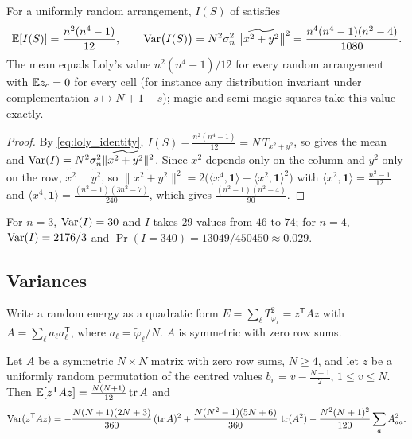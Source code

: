 \begin{corollary}
\label{cor:loly_null}
For a uniformly random arrangement, $I(S)$ of  satisfies
\begin{equation}
\mathbb{E}[I(S)]=\frac{n^{2}(n^{4}-1)}{12},\qquad
\mathrm{Var}\bigl(I(S)\bigr)=N^{2}\sigma_n^{2}\,\bigl\|\widetilde{x^2+y^2}\bigr\|^2=\frac{n^{4}(n^{4}-1)(n^{2}-4)}{1080}.
\label{eq:loly_null}
\end{equation}
The mean equals Loly's value $n^2(n^4-1)/12$ for every random arrangement with $\mathbb{E} z_c=0$ for every cell (for instance any distribution invariant under complementation $s\mapsto N+1-s$); magic and semi-magic squares take this value exactly.
\end{corollary}

\begin{proof}
By \eqref{eq:loly_identity}, $I(S)-\frac{n^2(n^4-1)}{12}=N\,T_{x^2+y^2}$, so  gives the mean and $\mathrm{Var}(I)=N^2\sigma_n^2\|\widetilde{x^2+y^2}\|^2$.
Since $x^2$ depends only on the column and $y^2$ only on the row, $\widetilde{x^2}\perp\widetilde{y^2}$, so $\|\widetilde{x^2+y^2}\|^2=2\bigl(\langle x^4,\mathbf 1\rangle-\langle x^2,\mathbf 1\rangle^2\bigr)$ with $\langle x^2,\mathbf 1\rangle=\frac{n^2-1}{12}$ and $\langle x^4,\mathbf 1\rangle=\frac{(n^2-1)(3n^2-7)}{240}$, which gives $\frac{(n^2-1)(n^2-4)}{90}$.
\end{proof}

For $n=3$, $\mathrm{Var}(I)=30$ and $I$ takes $29$ values from $46$ to $74$; for $n=4$, $\mathrm{Var}(I)=2176/3$ and $\Pr(I=340)=13049/450450\approx0.029$.

\subsection{Variances}
\label{sec:random_var}

Write a random energy as a quadratic form $E=\sum_\ell T_{\varphi_\ell}^2=z^{\mathsf T}Az$ with $A=\sum_\ell a_\ell a_\ell^{\mathsf T}$, where $a_\ell=\tilde\varphi_\ell/N$.
$A$ is symmetric with zero row sums.

\begin{proposition}
\label{prop:var_identity}
Let $A$ be a symmetric $N\times N$ matrix with zero row sums, $N\ge4$, and let $z$ be a uniformly random permutation of the centred values $b_v=v-\frac{N+1}2$, $1\le v\le N$.  Then $\mathbb{E}[z^{\mathsf T}Az]=\frac{N(N+1)}{12}\operatorname{tr} A$ and
\begin{equation}
\mathrm{Var}(z^{\mathsf T}Az)=-\frac{N(N+1)(2N+3)}{360}\,(\operatorname{tr} A)^2+\frac{N(N^2-1)(5N+6)}{360}\,\operatorname{tr}(A^2)-\frac{N^2(N+1)^2}{120}\sum_aA_{aa}^2 .
\label{eq:var_identity}
\end{equation}
\end{proposition}


